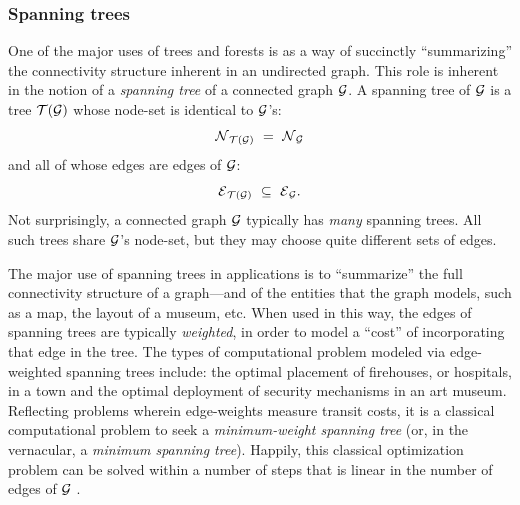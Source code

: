 \subsubsection{Spanning trees}

One of the major uses of trees and forests is as a way of succinctly
``summarizing'' the connectivity structure inherent in an undirected
graph.  This role is inherent in the notion of a {\it spanning tree}
  of a connected
graph $\mbox{$\cal G$}$.  A spanning tree of $\mbox{$\cal G$}$ is a tree $\mbox{$\cal T$}(\mbox{$\cal G$})$ whose node-set
is identical to $\mbox{$\cal G$}$'s:
\[ \mbox{$\cal N$}_{\mbox{{\scriptsize $\cal T$}}(\mbox{{\scriptsize $\cal G$}})} \ = \ \mbox{$\cal N$}_{\mbox{{\scriptsize $\cal G$}}} \]
and all of whose edges are edges of $\mbox{$\cal G$}$:
\[ \mbox{$\cal E$}_{\mbox{{\scriptsize $\cal T$}}(\mbox{{\scriptsize $\cal G$}})} \ \subseteq \ \mbox{$\cal E$}_{\mbox{{\scriptsize $\cal G$}}}. \]
Not surprisingly, a connected graph $\mbox{$\cal G$}$  typically has {\em many}
spanning trees.  All such trees share $\mbox{$\cal G$}$'s node-set, but they may
choose quite different sets of edges.



The major use of spanning trees in applications is to ``summarize''
the full connectivity structure of a graph---and of the entities that
the graph models, such as a map, the layout of a museum, etc.  When
used in this way, the edges of spanning trees are typically {\em
  weighted},  in order to
model a ``cost'' of incorporating that edge in the tree.  The types of
computational problem modeled via edge-weighted spanning trees
include: the optimal placement of firehouses, or hospitals, in a town
and the optimal deployment of security mechanisms in an art museum.
Reflecting problems wherein edge-weights measure transit costs, it is
a classical computational problem to seek a {\em minimum-weight
  spanning tree} 
 (or, in the vernacular, a {\em
  minimum spanning tree}).  Happily, this classical optimization
problem can be solved within a number of steps that is linear in the
number of edges of $\mbox{$\cal G$}$ \cite{CLRS}.


